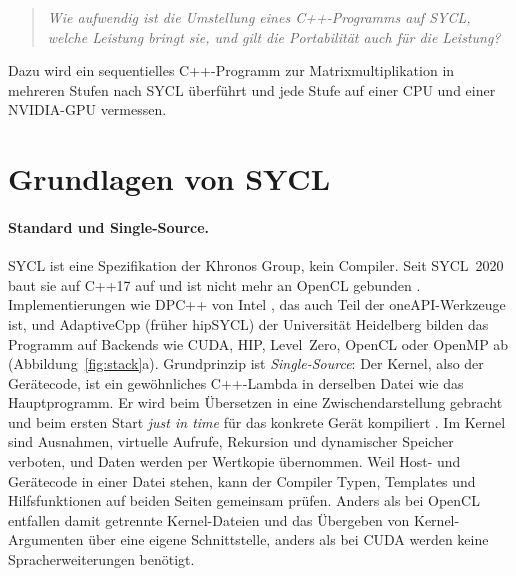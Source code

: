\documentclass[12pt,a4paper]{article}
\begin{document}
\begin{quote}
\emph{Wie aufwendig ist die Umstellung eines C++-Programms auf SYCL, welche
Leistung bringt sie, und gilt die Portabilität auch für die Leistung?}
\end{quote}

\noindent Dazu wird ein sequentielles C++-Programm zur Matrixmultiplikation in
mehreren Stufen nach SYCL überführt und jede Stufe auf einer CPU und einer
NVIDIA-GPU vermessen.

\section{Grundlagen von SYCL}\label{sec:grundlagen}

\paragraph{Standard und Single-Source.}
SYCL ist eine Spezifikation der Khronos Group, kein Compiler. Seit SYCL~2020
baut sie auf C++17 auf und ist nicht mehr an OpenCL gebunden
\cite{khronos2020sycl}. Implementierungen wie DPC++ von Intel
\cite{intel_llvm}, das auch Teil der oneAPI-Werkzeuge ist, und AdaptiveCpp
(früher hipSYCL) der Universität Heidelberg \cite{alpay2020hipsycl} bilden das Programm auf Backends wie CUDA, HIP,
Level~Zero, OpenCL oder OpenMP ab (Abbildung~\ref{fig:stack}a). Grundprinzip
ist \emph{Single-Source}: Der Kernel, also der Gerätecode, ist ein
gewöhnliches C++-Lambda in derselben Datei wie das Hauptprogramm. Er wird
beim Übersetzen in eine Zwischendarstellung gebracht und beim ersten Start
\emph{just in time} für das konkrete Gerät kompiliert
\cite{alpay2023sscp}. Im Kernel sind Ausnahmen, virtuelle Aufrufe, Rekursion
und dynamischer Speicher verboten, und Daten werden per Wertkopie übernommen.
Weil Host- und Gerätecode in einer Datei stehen, kann der Compiler Typen,
Templates und Hilfsfunktionen auf beiden Seiten gemeinsam prüfen. Anders als
bei OpenCL entfallen damit getrennte Kernel-Dateien und das Übergeben von
Kernel-Argumenten über eine eigene Schnittstelle, anders als bei CUDA werden
keine Spracherweiterungen benötigt.
\end{document}
